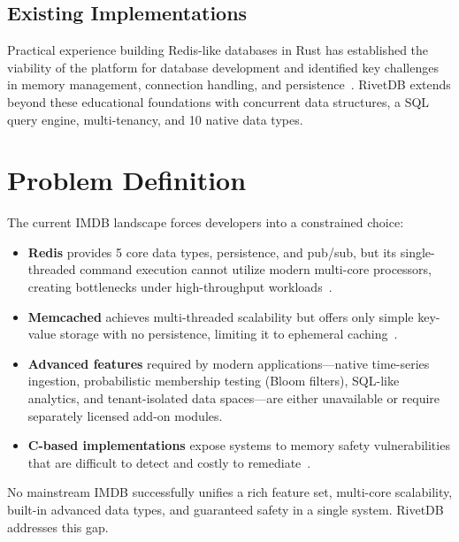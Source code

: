 \documentclass[conference,a4paper]{IEEEtran}
\begin{document}
\subsection{Existing Implementations}

Practical experience building Redis-like databases in Rust has established the viability of the platform for database development and identified key challenges in memory management, connection handling, and persistence~\cite{kumar2023}. RivetDB extends beyond these educational foundations with concurrent data structures, a SQL query engine, multi-tenancy, and 10 native data types.

\section{Problem Definition}

The current IMDB landscape forces developers into a constrained choice:

\begin{itemize}
    \item \textbf{Redis} provides 5 core data types, persistence, and pub/sub, but its single-threaded command execution cannot utilize modern multi-core processors, creating bottlenecks under high-throughput workloads~\cite{kumar2023}.
    \item \textbf{Memcached} achieves multi-threaded scalability but offers only simple key-value storage with no persistence, limiting it to ephemeral caching~\cite{kumar2023}.
    \item \textbf{Advanced features} required by modern applications---native time-series ingestion, probabilistic membership testing (Bloom filters), SQL-like analytics, and tenant-isolated data spaces---are either unavailable or require separately licensed add-on modules.
    \item \textbf{C-based implementations} expose systems to memory safety vulnerabilities that are difficult to detect and costly to remediate~\cite{jung2021}.
\end{itemize}

No mainstream IMDB successfully unifies a rich feature set, multi-core scalability, built-in advanced data types, and guaranteed safety in a single system. RivetDB addresses this gap.

\end{document}
